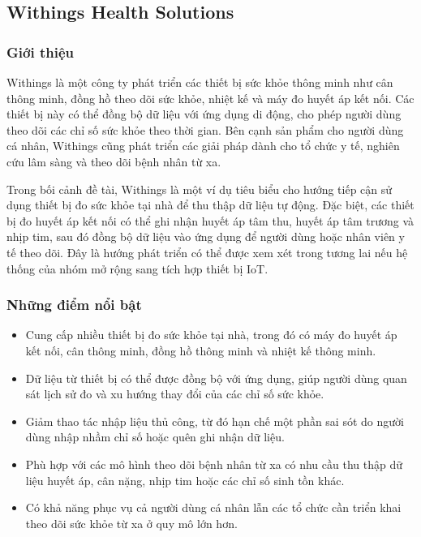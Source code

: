 \subsection{Withings Health Solutions}

\subsubsection{Giới thiệu}
\par Withings là một công ty phát triển các thiết bị sức khỏe thông minh như cân thông minh, đồng hồ theo dõi sức khỏe, nhiệt kế và máy đo huyết áp kết nối. Các thiết bị này có thể đồng bộ dữ liệu với ứng dụng di động, cho phép người dùng theo dõi các chỉ số sức khỏe theo thời gian. Bên cạnh sản phẩm cho người dùng cá nhân, Withings cũng phát triển các giải pháp dành cho tổ chức y tế, nghiên cứu lâm sàng và theo dõi bệnh nhân từ xa. \cite{withingsHealthSolutions}

\par Trong bối cảnh đề tài, Withings là một ví dụ tiêu biểu cho hướng tiếp cận sử dụng thiết bị đo sức khỏe tại nhà để thu thập dữ liệu tự động. Đặc biệt, các thiết bị đo huyết áp kết nối có thể ghi nhận huyết áp tâm thu, huyết áp tâm trương và nhịp tim, sau đó đồng bộ dữ liệu vào ứng dụng để người dùng hoặc nhân viên y tế theo dõi. Đây là hướng phát triển có thể được xem xét trong tương lai nếu hệ thống của nhóm mở rộng sang tích hợp thiết bị IoT.

\subsubsection{Những điểm nổi bật}
\begin{itemize}
    \item Cung cấp nhiều thiết bị đo sức khỏe tại nhà, trong đó có máy đo huyết áp kết nối, cân thông minh, đồng hồ thông minh và nhiệt kế thông minh. \cite{withingsHealthSolutions}
    \item Dữ liệu từ thiết bị có thể được đồng bộ với ứng dụng, giúp người dùng quan sát lịch sử đo và xu hướng thay đổi của các chỉ số sức khỏe.
    \item Giảm thao tác nhập liệu thủ công, từ đó hạn chế một phần sai sót do người dùng nhập nhầm chỉ số hoặc quên ghi nhận dữ liệu.
    \item Phù hợp với các mô hình theo dõi bệnh nhân từ xa có nhu cầu thu thập dữ liệu huyết áp, cân nặng, nhịp tim hoặc các chỉ số sinh tồn khác.
    \item Có khả năng phục vụ cả người dùng cá nhân lẫn các tổ chức cần triển khai theo dõi sức khỏe từ xa ở quy mô lớn hơn.
\end{itemize}

